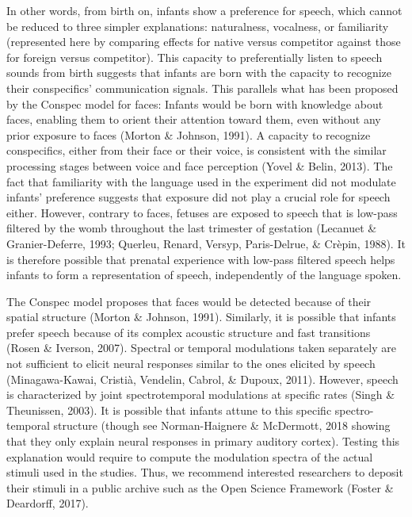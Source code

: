 \documentclass[man]{apa6}
\begin{document}
In other words, from birth on, infants show a preference for speech,
which cannot be reduced to three simpler explanations: naturalness,
vocalness, or familiarity (represented here by comparing effects for
native versus competitor against those for foreign versus competitor).
This capacity to preferentially listen to speech sounds from birth
suggests that infants are born with the capacity to recognize their
conspecifics' communication signals. This parallels what has been
proposed by the Conspec model for faces: Infants would be born with
knowledge about faces, enabling them to orient their attention toward
them, even without any prior exposure to faces (Morton \& Johnson,
1991). A capacity to recognize conspecifics, either from their face or
their voice, is consistent with the similar processing stages between
voice and face perception (Yovel \& Belin, 2013). The fact that
familiarity with the language used in the experiment did not modulate
infants' preference suggests that exposure did not play a crucial role
for speech either. However, contrary to faces, fetuses are exposed to
speech that is low-pass filtered by the womb throughout the last
trimester of gestation (Lecanuet \& Granier-Deferre, 1993; Querleu,
Renard, Versyp, Paris-Delrue, \& Crèpin, 1988). It is therefore possible
that prenatal experience with low-pass filtered speech helps infants to
form a representation of speech, independently of the language spoken.

The Conspec model proposes that faces would be detected because of their
spatial structure (Morton \& Johnson, 1991). Similarly, it is possible
that infants prefer speech because of its complex acoustic structure and
fast transitions (Rosen \& Iverson, 2007). Spectral or temporal
modulations taken separately are not sufficient to elicit neural
responses similar to the ones elicited by speech (Minagawa-Kawai,
Cristià, Vendelin, Cabrol, \& Dupoux, 2011). However, speech is
characterized by joint spectrotemporal modulations at specific rates
(Singh \& Theunissen, 2003). It is possible that infants attune to this
specific spectro-temporal structure (though see Norman-Haignere \&
McDermott, 2018 showing that they only explain neural responses in
primary auditory cortex). Testing this explanation would require to
compute the modulation spectra of the actual stimuli used in the
studies. Thus, we recommend interested researchers to deposit their
stimuli in a public archive such as the Open Science Framework (Foster
\& Deardorff, 2017).
\end{document}
